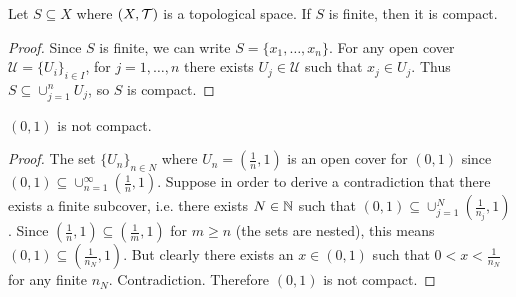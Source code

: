 \documentclass{article}
\begin{document}
\begin{example}
Let $S\subseteq X$ where $(X,\mathcal{T})$ is a topological space. If $S$ is finite, then it is compact. 
\end{example}
\begin{proof}
Since $S$ is finite, we can write $S = \{ x_1, \ldots, x_n\}$. For any open cover $\mathcal{U} = \{ U_i \}_{i\in I}$, for $j=1,\ldots,n$ there exists $U_j \in \mathcal{U}$ such that $x_j \in U_j$. Thus $S \subseteq \cup_{j=1}^n U_j$, so $S$ is compact.
\end{proof}

\begin{example}
$(0,1)$ is not compact.
\end{example}
\begin{proof}
The set $\{U_n\}_{n \in N}$ where $U_n = \left(\frac{1}{n},1\right)$ is an open cover for $(0,1)$ since $(0,1) \subseteq \cup_{n=1}^\infty \left(\frac{1}{n},1\right)$. Suppose in order to derive a contradiction that there exists a finite subcover, i.e. there exists $N \in {\mathbb{N}}$ such that $(0,1) \subseteq \cup_{j=1}^N \left(\frac{1}{n_j},1\right)$. Since $\left(\frac{1}{n},1\right) \subseteq \left(\frac{1}{m},1\right)$ for $m \geq n$ (the sets are nested), this means $(0,1) \subseteq  \left(\frac{1}{n_N},1\right)$. But clearly there exists an $x \in (0,1)$ such that $0 < x < \frac{1}{n_N}$ for any finite $n_N$. Contradiction. Therefore $(0,1)$ is not compact.
\end{proof}
\end{document}
